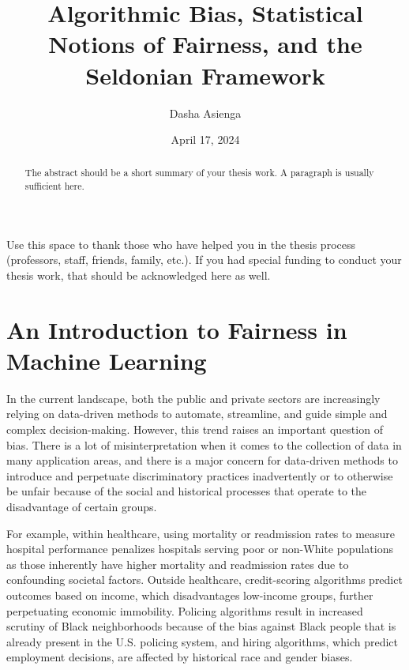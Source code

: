 \documentclass[12pt, twoside]{amherstthesis}
\title{Algorithmic Bias, Statistical Notions of Fairness, and the Seldonian Framework}
\author{Dasha Asienga}
\date{April 17, 2024}
\begin{document}
\doublespace
  \maketitle

\frontmatter %
\pagestyle{fancyplain}

  \begin{abstract}
    The abstract should be a short summary of your thesis work. A paragraph is usually sufficient here.
  \end{abstract}
  \begin{acknowledgments}
    Use this space to thank those who have helped you in the thesis process (professors, staff, friends, family, etc.). If you had special funding to conduct your thesis work, that should be acknowledged here as well.
  \end{acknowledgments}

  \hypersetup{linkcolor=black}
  \setcounter{tocdepth}{2}
  \tableofcontents

  \listoftables

  \listoffigures


\mainmatter %
\pagestyle{fancyplain} %

\hypertarget{intro}{%
\chapter{An Introduction to Fairness in Machine Learning}\label{intro}}

In the current landscape, both the public and private sectors are increasingly relying on data-driven methods to automate, streamline, and guide simple and complex decision-making. However, this trend raises an important question of bias. There is a lot of misinterpretation when it comes to the collection of data in many application areas, and there is a major concern for data-driven methods to introduce and perpetuate discriminatory practices inadvertently or to otherwise be unfair because of the social and historical processes that operate to the disadvantage of certain groups.

For example, within healthcare, using mortality or readmission rates to measure hospital performance penalizes hospitals serving poor or non-White populations as those inherently have higher mortality and readmission rates due to confounding societal factors. Outside healthcare, credit-scoring algorithms predict outcomes based on income, which disadvantages low-income groups, further perpetuating economic immobility. Policing algorithms result in increased scrutiny of Black neighborhoods because of the bias against Black people that is already present in the U.S. policing system, and hiring algorithms, which predict employment decisions, are affected by historical race and gender biases.
\end{document}
